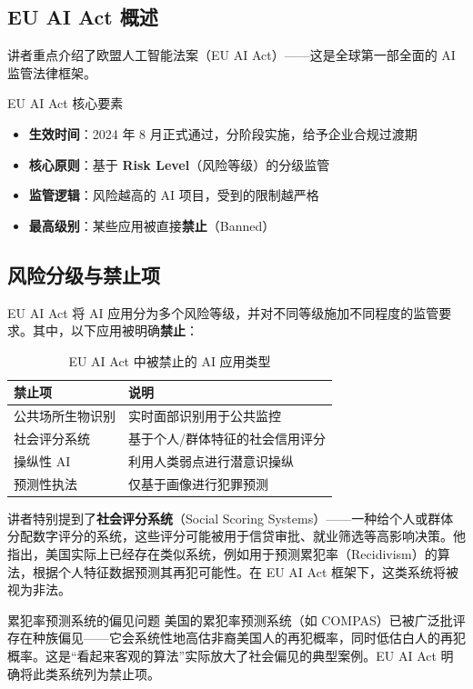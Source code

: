 \documentclass[a4paper]{article}
\begin{document}
\subsection{EU AI Act 概述}

讲者重点介绍了欧盟人工智能法案（EU AI Act）——这是全球第一部全面的 AI 监管法律框架。

\begin{importantbox}{EU AI Act 核心要素}
\begin{itemize}
    \item \textbf{生效时间}：2024 年 8 月正式通过，分阶段实施，给予企业合规过渡期
    \item \textbf{核心原则}：基于 \textbf{Risk Level}（风险等级）的分级监管
    \item \textbf{监管逻辑}：风险越高的 AI 项目，受到的限制越严格
    \item \textbf{最高级别}：某些应用被直接\textbf{禁止}（Banned）
\end{itemize}
\end{importantbox}

\subsection{风险分级与禁止项}

EU AI Act 将 AI 应用分为多个风险等级，并对不同等级施加不同程度的监管要求。其中，以下应用被明确\textbf{禁止}：

\begin{table}[H]
\centering
\caption{EU AI Act 中被禁止的 AI 应用类型}
\begin{tabular}{@{}ll@{}}
\toprule
\textbf{禁止项} & \textbf{说明} \\
\midrule
公共场所生物识别 & 实时面部识别用于公共监控 \\
社会评分系统 & 基于个人/群体特征的社会信用评分 \\
操纵性 AI & 利用人类弱点进行潜意识操纵 \\
预测性执法 & 仅基于画像进行犯罪预测 \\
\bottomrule
\end{tabular}
\end{table}

讲者特别提到了\textbf{社会评分系统}（Social Scoring Systems）——一种给个人或群体分配数字评分的系统，这些评分可能被用于信贷审批、就业筛选等高影响决策。他指出，美国实际上已经存在类似系统，例如用于预测累犯率（Recidivism）的算法，根据个人特征数据预测其再犯可能性。在 EU AI Act 框架下，这类系统将被视为非法。

\begin{warningbox}{累犯率预测系统的偏见问题}
美国的累犯率预测系统（如 COMPAS）已被广泛批评存在种族偏见——它会系统性地高估非裔美国人的再犯概率，同时低估白人的再犯概率。这是``看起来客观的算法''实际放大了社会偏见的典型案例。EU AI Act 明确将此类系统列为禁止项。
\end{warningbox}
\end{document}
